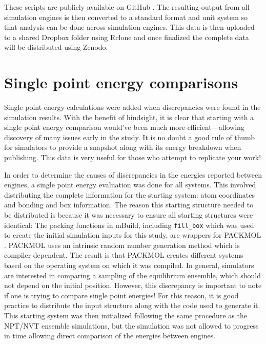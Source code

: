 These scripts are publicly available on GitHub \citep{reproducibility}.
The resulting output from all simulation engines is then converted to a standard format and unit system so that analysis can be done across simulation engines.
This data is then uploaded to a shared Dropbox folder using Rclone and once finalized the complete data will be distributed using Zenodo.

\section{Single point energy comparisons}

Single point energy calculations were added when discrepancies were found in the simulation results. 
With the benefit of hindsight, it is clear that starting with a single point energy comparison would've been much more efficient---allowing discovery of many issues early in the study. 
It is no doubt a good rule of thumb for simulators to provide a snapshot along with its energy breakdown when publishing. 
This data is very useful for those who attempt to replicate your work!

In order to determine the causes of discrepancies in the energies reported between engines, a single point energy evaluation was done for all systems. 
This involved distributing the complete information for the starting system: atom coordinates and bonding and box information. 
The reason this starting structure needed to be distributed is because it was necessary to ensure all starting structures were identical:
The packing functions in mBuild, including \lstinline{fill_box} which was used to create the initial simulation inputs for this study, are wrappers for PACKMOL \citep{Martinez2003, Martinez2009}.
PACKMOL uses an intrinsic random number generation method which is compiler dependent. 
The result is that PACKMOL creates different systems based on the operating system on which it was compiled.
In general, simulators are interested in comparing a sampling of the equilibrium ensemble, which should not depend on the initial position.
However, this discrepancy is important to note if one is trying to compare single point energies!
For this reason, it is good practice to distribute the input structure along with the code used to generate it.
This starting system was then initialized following the same procedure as the NPT/NVT ensemble simulations, but the simulation was not allowed to progress in time allowing direct comparison of the energies between engines.

